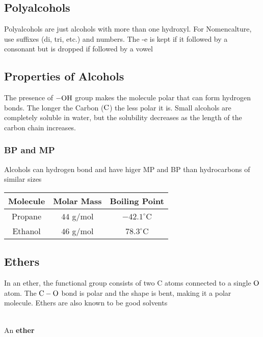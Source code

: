 \documentclass[12pt, a4paper]{article}
\newcommand{\C}{\ce{C}}
\begin{document}
    \subsection{Polyalcohols}

    Polyalcohols are just alcohols with more than one hydroxyl. For Nomencalture, use suffixes
    (di, tri, etc.) and numbers. The -e is kept if it followed by a consonant but is dropped
    if followed by a vowel

    \subsection{Properties of Alcohols}

    The presence of $\ce{-OH}$ group makes the molecule polar that can form hydrogen bonds. The longer
    the Carbon ($\C$) the less polar it is. Small alcohols are completely soluble in water, but the 
    solubility decreases as the length of the carbon chain increases. 

    \subsubsection{BP and MP}

    Alcohols can hydrogen bond and have higer MP and BP than 
    hydrocarbons of similar sizes

    \begin{center}
        \begin{tabular}{ | c | c | c |}
            \hline
            Molecule & Molar Mass & Boiling Point \\
            \hline
            Propane & $44$ g/mol & $-42.1^{\circ}$C \\
            \hline
            Ethanol & $46$ g/mol & $78.3^{\circ}$C \\
            \hline
        \end{tabular}
    \end{center}

    \subsection{Ethers}

    In an ether, the functional group consists of two C atoms connected to a single $\ce{O}$
    atom. The $\ce{C - O}$ bond is polar and the shape is bent, making it a polar molecule. Ethers
    are also known to be good solvents

    \begin{center}
        \\
        \vspace*{2mm}
        An \textbf{ether}
    \end{center}
\end{document}

